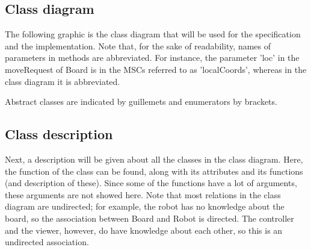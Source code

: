 \subsection{Class diagram}
	The following graphic is the class diagram that will be used for the specification and the implementation. Note that, for the sake of readability, names of parameters in methods are abbreviated. For instance, the parameter 'loc' in the moveRequest of Board is in the MSCs referred to as 'localCoords', whereas in the class diagram it is abbreviated.

	
    Abstract classes are indicated by guillemets and enumerators by brackets.

\subsection{Class description}
    Next, a description will be given about all the classes in the class diagram. Here, the function of the class can be found, along with its attributes and its functions (and description of these). Since some of the functions have a lot of arguments, these arguments are not showed here. Note that most relations in the class diagram are undirected; for example, the robot has no knowledge about the board, so the association between Board and Robot is directed. The controller and the viewer, however, do have knowledge about each other, so this is an undirected association.

